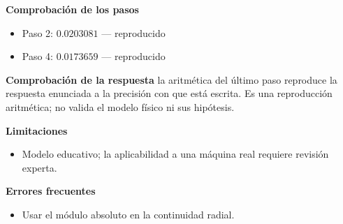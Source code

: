 \documentclass[10pt,openany]{book}
\begin{document}
\begin{tcolorbox}[title={Problema resuelto 3}, studiumworked, breakable]
\noindent\textbf{Comprobación de los pasos}
\begin{itemize}
\item Paso 2: $0.0203081$ — reproducido
\item Paso 4: $0.0173659$ — reproducido
\end{itemize}

\noindent\textbf{Comprobación de la respuesta} la aritmética del último paso reproduce la respuesta enunciada a la precisión con que está escrita. Es una reproducción aritmética; no valida el modelo físico ni sus hipótesis.

\noindent\textbf{Limitaciones}
\begin{itemize}
\item Modelo educativo; la aplicabilidad a una máquina real requiere revisión experta.
\end{itemize}

\noindent\textbf{Errores frecuentes}
\begin{itemize}
\item Usar el módulo absoluto en la continuidad radial.
\end{itemize}
\end{tcolorbox}
\end{document}
